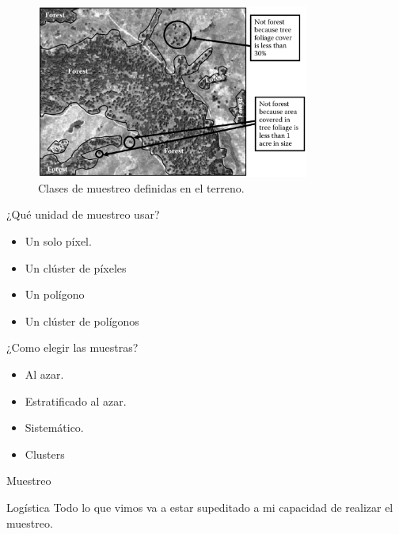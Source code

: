 \documentclass[handout]{beamer}
\begin{document}
\begin{frame}{\subsecname}
  \begin{figure}
  \includegraphics[width=0.8\textwidth]{imagenes/unidad_mapa.png}
  \caption{Clases de muestreo definidas en el terreno.}
  \end{figure}
\end{frame}

\begin{frame}{\subsecname}
  \begin{block}{¿Qué unidad de muestreo usar?}
    \begin{itemize}[<+>]
      \item Un solo píxel.
      \item Un clúster de píxeles
      \item Un polígono
      \item Un clúster de polígonos
    \end{itemize}
  \end{block}
\end{frame}

\begin{frame}{\subsecname}
  \begin{block}{¿Como elegir las muestras?}
    \begin{itemize}[<+>]
      \item Al azar.
      \item Estratificado al azar.
      \item Sistemático.
      \item Clusters
    \end{itemize}
  \end{block}
\end{frame}

\begin{frame}{Muestreo}
  \begin{alertblock}{Logística}
    Todo lo que vimos va a estar supeditado a mi capacidad de realizar el muestreo.
  \end{alertblock}
\end{frame}
\end{document}
